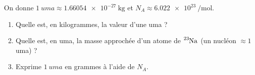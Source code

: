 \documentclass[11pt,a4paper]{article}
\begin{document}
\begin{exo}
On donne $\SI{1}{uma} \approx \SI{1,66054e-27}{\kilo\gram}$ et $N_{\!A} \approx \SI{6,022e23}{\per\mole}$.
\begin{enumerate}[label=\alph*)]
  \item Quelle est, en kilogrammes, la valeur d'une uma ?
  \item Quelle est, en uma, la masse approchée d'un atome de $\ce{^{23}Na}$ (un nucléon $\approx 1$ uma) ?
  \item Exprime $\SI{1}{uma}$ en grammes à l'aide de $N_{\!A}$.
\end{enumerate}
\end{exo}
\end{document}
